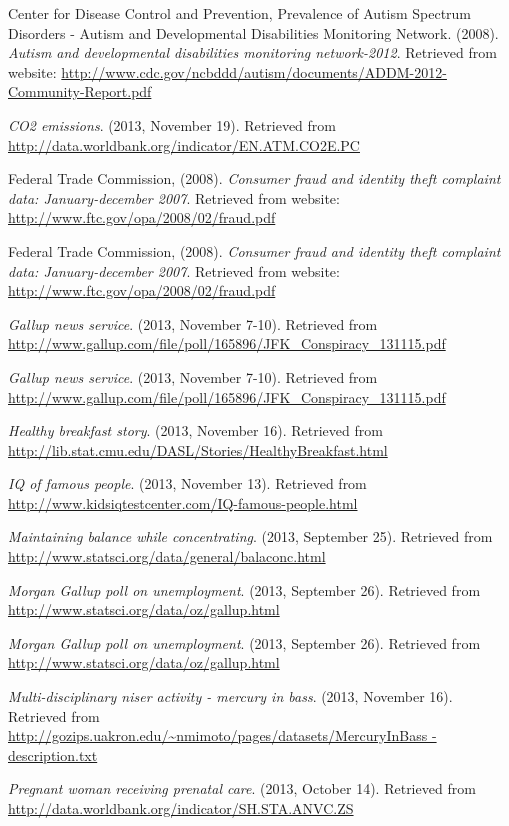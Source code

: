 \documentclass[]{book}
\begin{document}
Center for Disease Control and Prevention, Prevalence of Autism Spectrum
Disorders - Autism and Developmental Disabilities Monitoring Network.
(2008). \emph{Autism and developmental disabilities monitoring network-2012}.
Retrieved from website:
\url{http://www.cdc.gov/ncbddd/autism/documents/ADDM-2012-Community-Report.pdf}

\emph{CO2 emissions}. (2013, November 19). Retrieved from
\url{http://data.worldbank.org/indicator/EN.ATM.CO2E.PC}

Federal Trade Commission, (2008). \emph{Consumer fraud and identity theft
complaint data: January-december 2007}. Retrieved from website:
\url{http://www.ftc.gov/opa/2008/02/fraud.pdf}

Federal Trade Commission, (2008). \emph{Consumer fraud and identity theft
complaint data: January-december 2007}. Retrieved from website:
\url{http://www.ftc.gov/opa/2008/02/fraud.pdf}

\emph{Gallup news service}. (2013, November 7-10). Retrieved from
\url{http://www.gallup.com/file/poll/165896/JFK_Conspiracy_131115.pdf}

\emph{Gallup news service}. (2013, November 7-10). Retrieved from
\url{http://www.gallup.com/file/poll/165896/JFK_Conspiracy_131115.pdf}

\emph{Healthy breakfast story}. (2013, November 16). Retrieved from
\url{http://lib.stat.cmu.edu/DASL/Stories/HealthyBreakfast.html}

\emph{IQ of famous people}. (2013, November 13). Retrieved from
\url{http://www.kidsiqtestcenter.com/IQ-famous-people.html}

\emph{Maintaining balance while concentrating}. (2013, September 25).
Retrieved from \url{http://www.statsci.org/data/general/balaconc.html}

\emph{Morgan Gallup poll on unemployment}. (2013, September 26). Retrieved
from \url{http://www.statsci.org/data/oz/gallup.html}

\emph{Morgan Gallup poll on unemployment}. (2013, September 26). Retrieved
from \url{http://www.statsci.org/data/oz/gallup.html}

\emph{Multi-disciplinary niser activity - mercury in bass}. (2013, November
16). Retrieved from
\href{http://gozips.uakron.edu/~nmimoto/pages/datasets/MercuryInBass\%20-\%20description.txt}{http://gozips.uakron.edu/\textasciitilde{}nmimoto/pages/datasets/MercuryInBass -
description.txt}

\emph{Pregnant woman receiving prenatal care}. (2013, October 14). Retrieved
from \url{http://data.worldbank.org/indicator/SH.STA.ANVC.ZS}
\end{document}
